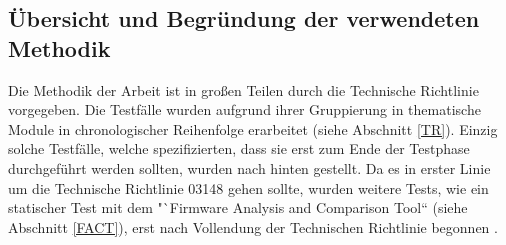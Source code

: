 \documentclass[a4paper]{book}
\begin{document}
\begin{large}
\section{Übersicht und Begründung der verwendeten Methodik}
\label{overview methods}
\begin{onehalfspace}
Die Methodik der Arbeit ist in großen Teilen durch die Technische Richtlinie vorgegeben. Die Testfälle wurden aufgrund ihrer Gruppierung in thematische Module in chronologischer Reihenfolge erarbeitet (siehe Abschnitt \ref{TR}). Einzig solche Testfälle, welche spezifizierten, dass sie erst zum Ende der Testphase durchgeführt werden sollten, wurden nach hinten gestellt. Da es in erster Linie um die Technische Richtlinie 03148 gehen sollte, wurden weitere Tests, wie ein statischer Test mit dem "`Firmware Analysis and Comparison Tool“ (siehe Abschnitt \ref{FACT}), erst nach Vollendung der Technischen Richtlinie begonnen \cite{FraunhoferFKIE.2020}. 	\newline\indent

\end{onehalfspace}
\end{large}
\end{document}
